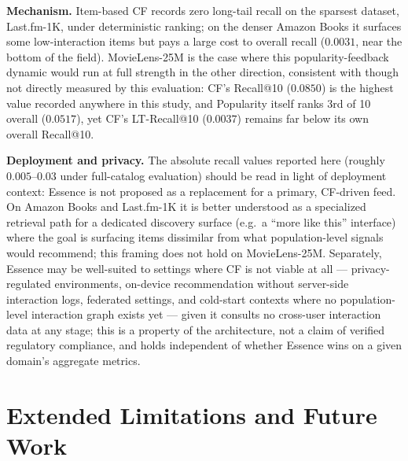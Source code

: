 \documentclass{article}
\begin{document}
\textbf{Mechanism.} Item-based CF records zero long-tail recall on the sparsest dataset, Last.fm-1K, under deterministic ranking; on the denser Amazon Books it surfaces some low-interaction items but pays a large cost to overall recall ($0.0031$, near the bottom of the field). MovieLens-25M is the case where this popularity-feedback dynamic would run at full strength in the other direction, consistent with though not directly measured by this evaluation: CF's Recall@10 ($0.0850$) is the highest value recorded anywhere in this study, and Popularity itself ranks 3rd of 10 overall ($0.0517$), yet CF's LT-Recall@10 ($0.0037$) remains far below its own overall Recall@10.

\textbf{Deployment and privacy.} The absolute recall values reported here (roughly $0.005$--$0.03$ under full-catalog evaluation) should be read in light of deployment context: Essence is not proposed as a replacement for a primary, CF-driven feed. On Amazon Books and Last.fm-1K it is better understood as a specialized retrieval path for a dedicated discovery surface (e.g.\ a ``more like this'' interface) where the goal is surfacing items dissimilar from what population-level signals would recommend; this framing does not hold on MovieLens-25M. Separately, Essence may be well-suited to settings where CF is not viable at all --- privacy-regulated environments, on-device recommendation without server-side interaction logs, federated settings, and cold-start contexts where no population-level interaction graph exists yet --- given it consults no cross-user interaction data at any stage; this is a property of the architecture, not a claim of verified regulatory compliance, and holds independent of whether Essence wins on a given domain's aggregate metrics.

\section{Extended Limitations and Future Work}
\label{app:limitations}
\end{document}
